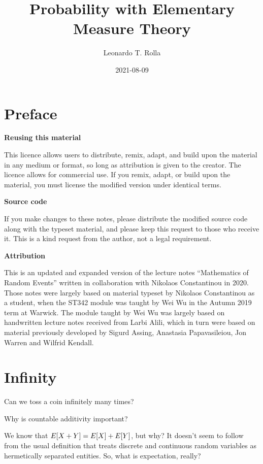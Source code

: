 \documentclass[
]{book}
\title{Probability with Elementary Measure Theory}
\author{Leonardo T. Rolla}
\date{2021-08-09}
\theoremstyle{definition}
\theoremstyle{remark}
\let\mathbb\relax %
\newcommand{\E}{\mathbb{E}}
\begin{document}
\maketitle

{
\setcounter{tocdepth}{1}
\tableofcontents
}
\hypertarget{preface}{%
\chapter*{Preface}\label{preface}}

\textbf{Reusing this material}

This licence allows users to distribute, remix, adapt, and build upon
the material in any medium or format, so long as attribution is given to
the creator. The licence allows for commercial use. If you remix, adapt,
or build upon the material, you must license the modified version under
identical terms.

\textbf{Source code}

If you make changes to these notes, please distribute the modified
source code along with the typeset material, and please keep this
request to those who receive it. This is a kind request from the author,
not a legal requirement.

\textbf{Attribution}

This is an updated and expanded version of the lecture notes
``Mathematics of Random Events'' written in collaboration with Nikolaos
Constantinou in 2020. Those notes were largely based on material typeset
by Nikolaos Constantinou as a student, when the ST342 module was taught
by Wei Wu in the Autumn 2019 term at Warwick. The module taught by Wei
Wu was largely based on handwritten lecture notes received from Larbi
Alili, which in turn were based on material previously developed by
Sigurd Assing, Anastasia Papavasileiou, Jon Warren and Wilfrid Kendall.

\hypertarget{sec:intro}{%
\chapter{Infinity}\label{sec:intro}}

Can we toss a coin infinitely many times?

Why is countable additivity important?

We know that \(\E[X+Y]=\E[X] + \E[Y]\), but why? It doesn't seem to follow
from the usual definition that treats discrete and continuous random
variables as hermetically separated entities. So, what is expectation,
really?
\end{document}
